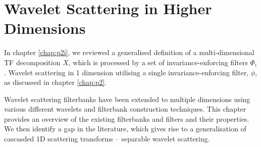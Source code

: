 \chapter{Wavelet Scattering in Higher Dimensions}
\label{chap:p3i}

In chapter \ref*{chap:p2i}, we reviewed a generalised definition of a multi-dimensional TF decomposition $X$, which is processed by a set of invariance-enforcing filters $\Phi_i$. Wavelet scattering in 1 dimension utilising a single invariance-enforcing filter, $\phi$, as discussed in chapter \ref*{chap:p2}.

Wavelet scattering filterbanks have been extended to multiple dimensions using various different wavelets and filterbank construction techniques. This chapter provides an overview of the existing filterbanks and filters and their properties. We then identify a gap in the literature, which gives rise to a generalisation of cascasded 1D scattering transforms -- separable wavelet scattering.

